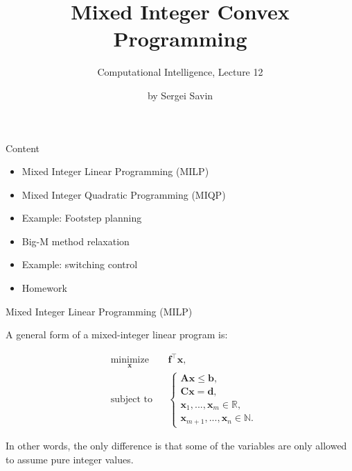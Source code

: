 \documentclass{beamer}
\title{Mixed Integer Convex Programming}
\subtitle{Computational Intelligence, Lecture 12}
\author{by Sergei Savin}
\date{\mydate}
\begin{document}
\maketitle


\begin{frame}{Content}

\begin{itemize}
\item Mixed Integer Linear Programming (MILP)
\item Mixed Integer Quadratic Programming (MIQP)
\item Example: Footstep planning
\item Big-M method relaxation
\item Example: switching control
\item Homework
\end{itemize}

\end{frame}



\begin{frame}{Mixed Integer Linear Programming (MILP)}
\begin{flushleft}

A general form of a mixed-integer linear program is:

%
\begin{equation} \label{LP}
\begin{aligned}
& \underset{\mathbf{x}}{\text{minimize}}
& & \mathbf{f}^\top \mathbf{x}, \\
& \text{subject to}
& & \begin{cases} 
\mathbf{A} \mathbf{x}
\leq 
\mathbf{b}, \\ 
\mathbf{C}\mathbf{x} = 
\mathbf{d},  \\
\mathbf{x}_1, ..., \mathbf{x}_m \in \mathbb{R},\\
\mathbf{x}_{m+1}, ..., \mathbf{x}_n \in \mathbb{N}.
\end{cases}
%
\end{aligned}
\end{equation}
 
In other words, the only difference is that some of the variables are only allowed to assume pure integer values.
 
\end{flushleft}
\end{frame}
\end{document}
